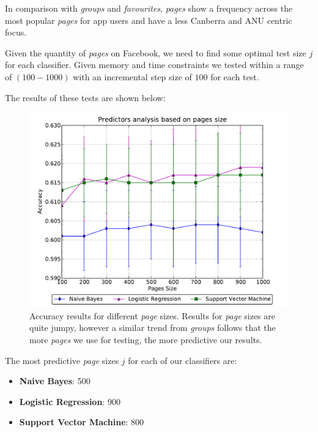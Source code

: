 In comparison with \emph{groups} and \emph{favourites}, \emph{pages} show a frequency across the most popular \emph{pages} for app users and 
have a less Canberra and ANU centric focus.

Given the quantity of \emph{pages} on Facebook, we need to find some optimal test size $j$ for each classifier. Given memory and time constraints we tested 
within a range of $(100-1000)$ with an incremental step size of $100$ for each test.

\clearpage

The results of these tests are shown below:

\begin{figure}[h]
	\begin{center}
		\includegraphics[scale=0.75]{results/pages/top_pages.pdf}
		\caption{Accuracy results for different \emph{page} sizes. Results for \emph{page} sizes are quite jumpy, however a similar trend 
				 from \emph{groups} follows that the more \emph{pages} we use for testing, the more predictive our results.}
	\end{center}
\end{figure}

The most predictive \emph{page} sizes $j$ for each of our classifiers are:
\begin{itemize}
\item \textbf{Naive Bayes}: 500
\item \textbf{Logistic Regression}: 900
\item \textbf{Support Vector Machine}: 800
\end{itemize}

